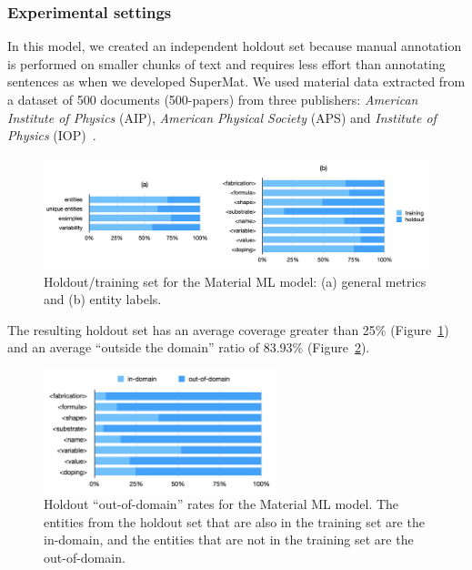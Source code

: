 \subsubsection{Experimental settings}

In this model, we created an independent holdout set because manual annotation is performed on smaller chunks of text and requires less effort than annotating sentences as when we developed SuperMat.
We used material data extracted from a dataset of 500 documents (500-papers) from three publishers: \textit{American Institute of Physics} (AIP), \textit{American Physical Society} (APS) and \textit{Institute of Physics} (IOP)~\cite{foppiano2019proposal}.

\begin{figure}[ht]
    \centering
    \includegraphics[width=\textwidth]{figures/automatic_extraction_supercon/material-holdout-training-set}
    \caption{Holdout/training set for the Material ML model: (a) general metrics and (b) entity labels.}
    \label{fig:material-training-holdout-set-distribution}
\end{figure}

The resulting holdout set has an average coverage greater than 25\% (Figure~\ref{fig:material-training-holdout-set-distribution}) and an average ``outside the domain'' ratio of 83.93\% (Figure~\ref{fig:material-out-domain-holdout}).

\begin{figure}[ht]
    \centering
    \includegraphics[width=0.6\textwidth]{figures/automatic_extraction_supercon/material-out-domain-holdout-unique}
    \caption{Holdout ``out-of-domain'' rates for the Material ML model. The entities from the holdout set that are also in the training set are the in-domain, and the entities that are not in the training set are the out-of-domain.}
    \label{fig:material-out-domain-holdout}
\end{figure}


